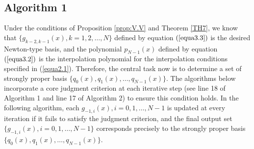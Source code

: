 \documentclass[preprint,12pt]{elsarticle}
\begin{document}
\subsection{Algorithm 1}
Under the conditions of Proposition \ref{prop:V.V} and Theorem \ref{TH7}, we know that $\{g_{k-2,k-1}(x),k=1,2,\dots,N\}$
defined by equation $(\ref{equa3.3})$ is the desired Newton-type basis, and the polynomial $p_{N-1}(x)$ defined by equation $(\ref{equa3.2})$ is the  interpolation polynomial  for the interpolation conditions specified in (\ref{equa2.1}). 
Therefore, the central task now is to determine a set of strongly proper basis $\{q_{0}(x),q_{1}(x),\dots,q_{N-1}(x)\}$. The algorithms below incorporate a core judgment criterion at each iterative step (see line 18 of Algorithm 1 and line 17 of Algorithm 2) to ensure this condition holds.
In the following algorithm, each $g_{-1,i}(x),i=0,1,\dots,N-1$ is updated at every iteration if it fails to  satisfy the judgment criterion, and the final output set 
$\{g_{-1,i}(x),i=0,1,\dots,N-1 \}$ corresponds precisely to the strongly proper basis $\{q_0(x),q_1(x),\dots,q_{N-1}(x)\}$.
\end{document}

